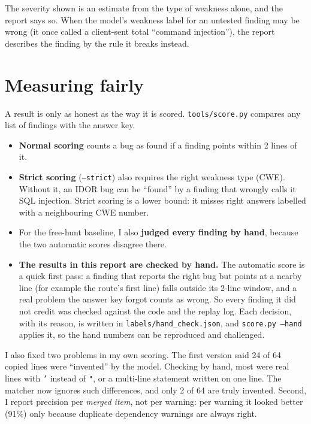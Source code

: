 \documentclass[11pt,a4paper]{article}
\newcommand{\code}[1]{\texttt{#1}}
\begin{document}
The severity shown is an estimate from the type of weakness alone, and the report says so. When the model's
weakness label for an untested finding may be wrong (it once called a client-sent total ``command injection''), the
report describes the finding by the rule it breaks instead.

\section{Measuring fairly}

A result is only as honest as the way it is scored. \code{tools/score.py} compares any list of findings with the
answer key.

\begin{itemize}
  \item \textbf{Normal scoring} counts a bug as found if a finding points within 2 lines of it.
  \item \textbf{Strict scoring} (\code{--strict}) also requires the right weakness type (CWE). Without it, an IDOR
        bug can be ``found'' by a finding that wrongly calls it SQL injection. Strict scoring is a lower bound: it
        misses right answers labelled with a neighbouring CWE number.
  \item For the free-hunt baseline, I also \textbf{judged every finding by hand}, because the two automatic scores
        disagree there.
  \item \textbf{The results in this report are checked by hand.} The automatic score is a quick first pass: a
        finding that reports the right bug but points at a nearby line (for example the route's first line)
        falls outside its 2-line window, and a real problem the answer key forgot counts as wrong. So every
        finding it did not credit was checked against the code and the replay log. Each decision, with its
        reason, is written in \code{labels/hand\_check.json}, and \code{score.py --hand} applies it, so the hand
        numbers can be reproduced and challenged.
\end{itemize}

I also fixed two problems in my own scoring. The first version said 24 of 64 copied lines were ``invented''
by the model. Checking by hand, most were real lines with \code{'} instead of \code{"}, or a multi-line statement
written on one line. The matcher now ignores such differences, and only 2 of 64 are truly invented. Second, I
report precision per \emph{merged item}, not per warning: per warning it looked better (91\%) only because
duplicate dependency warnings are always right.
\end{document}
